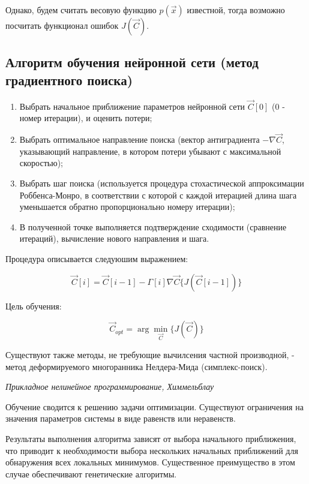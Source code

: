 \documentclass{article}
\begin{document}
Однако, будем считать весовую функцию $p(\vec{x})$ известной, тогда возможно посчитать функционал ошибок $J(\vec{C})$.

\subsection{Алгоритм обучения нейронной сети (метод градиентного поиска)}
\begin{enumerate}
    \item Выбрать начальное приближение параметров нейронной сети $\vec{C}[0]$ ($0$ - номер итерации), и оценить потери;
    \item Выбрать оптимальное направление поиска (вектор антиградиента $-\nabla\vec{C}$, указывающий направление, в котором потери убывают с максимальной скоростью);
    \item Выбрать шаг поиска (используется процедура стохастической аппроксимации Роббенса-Монро, в соответствии с которой с каждой итерацией длина шага уменьшается обратно пропорционально номеру итерации);
    \item[] В полученной точке выполняется подтверждение сходимости (сравнение итераций), вычисление нового направления и шага.
\end{enumerate}

Процедура описывается следуюшим выражением:

\begin{equation}
    \vec{C}[i] = \vec{C}[i-1] - \Gamma[i] \nabla\vec{C} \{ J(\vec{C}[i-1]) \}
\end{equation}

Цель обучения: 

\begin{equation}
    \vec{C}_{opt} = \arg \min_{\vec{C}} \{ J(\vec{C}) \}
\end{equation}

Существуют также методы, не требующие вычилсения частной производной, - метод деформируемого многоранника Нелдера-Мида (симплекс-поиск).

\begin{myquote}
    \textit{Прикладное нелинейное программирование, Химмельблау}
\end{myquote}

Обучение сводится к решению задачи оптимизации. Существуют ограничения на значения параметров системы в виде равенств или неравенств.

Результаты выполнения алгоритма зависят от выбора начального приближения, что приводит к необходимости выбора нескольких начальных приближений для обнаружения всех локальных минимумов.
Существенное преимущество в этом случае обеспечивают генетические алгоритмы.
\end{document}
